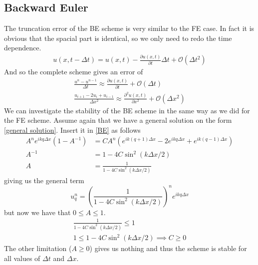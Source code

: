 \documentclass[a4paper,english, 10pt, twoside]{article}
\begin{document}
\subsection{Backward Euler}
The truncation error of the BE scheme is very similar to the FE case. In fact it is obvious that the spacial part is identical, so 
we only need to redo the time dependence.
\begin{align*}
 u(x,t-\Delta t) = u(x,t) -\frac{\partial u(x,t)}{\partial t}\Delta t + \mathcal{O}(\Delta t^2)
\end{align*}
And so the complete scheme gives an error of
\begin{align*}
  \frac{u^{n}-u^{n-1}}{\Delta t} \approx \frac{\partial u(x,t)}{\partial t} +\mathcal{O}(\Delta t)\\
 \frac{u_{i+1}-2u_i +u_{i-1}}{\Delta x^2} \approx \frac{\partial^2 u(x,t)}{\partial x^2} +\mathcal{O}(\Delta x^2)
\end{align*}
We can investigate the stability of the BE scheme in the same way as we did for the FE scheme. Assume again that we have a general 
solution on the form \ref{general solution}. Insert it in \ref{BE} as follows
\begin{align*}
 A^ne^{ikq\Delta x}(1-A^{-1}) &= CA^n\left(e^{ik(q+1)\Delta x}-2e^{ikq\Delta x} + e^{ik(q-1)\Delta x}\right)\\
 A^{-1} &= 1-4C\sin^2(k\Delta x/2)\\
 A &= \frac{1}{1-4C\sin^2(k\Delta x/2)}
\end{align*}
giving us the general term
$$
u^n_q = \left(\frac{1}{1-4C\sin^2(k\Delta x/2)}\right)^ne^{ikq\Delta x}
$$
but now we have that $0\leq A \leq 1$. 
\begin{align*}
 \frac{1}{1-4C\sin^2(k\Delta x/2)}\leq 1 \\
 1 \leq 1-4C\sin^2(k\Delta x/2) \implies C\geq 0
\end{align*}
The other limitation ($A\geq 0$) gives us nothing and thus the scheme is stable for all values of $\Delta t$ and $\Delta x$.
\end{document}
